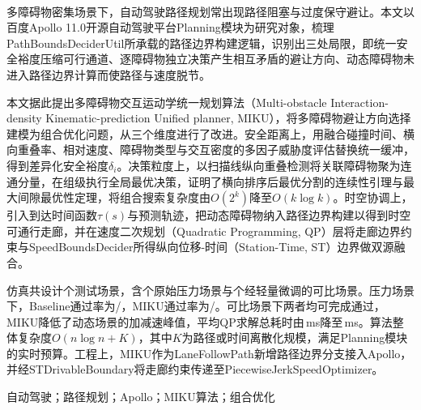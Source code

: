 \clearpage
{}
{}
\thispagestyle{fancy}

\begin{center}
{\heiti\bfseries \thesisTitleZhA\\\thesisTitleZhB}
\end{center}

\vspace{1em}

{\songti

\noindent\hspace{2em}{\heiti\bfseries 摘要：}多障碍物密集场景下，自动驾驶路径规划常出现路径阻塞与过度保守避让。本文以百度Apollo 11.0开源自动驾驶平台Planning模块为研究对象，梳理PathBoundsDeciderUtil所承载的路径边界构建逻辑，识别出三处局限，即统一安全裕度压缩可行通道、逐障碍物独立决策产生相互矛盾的避让方向、动态障碍物未进入路径边界计算而使路径与速度脱节。

本文据此提出多障碍物交互运动学统一规划算法（Multi-obstacle Interaction-density Kinematic-prediction Unified planner, MIKU），将多障碍物避让方向选择建模为组合优化问题，从三个维度进行了改进。安全距离上，用融合碰撞时间、横向重叠率、相对速度、障碍物类型与交互密度的多因子威胁度评估替换统一缓冲，得到差异化安全裕度$\delta_i$。决策粒度上，以扫描线纵向重叠检测将关联障碍物聚为连通分量，在组级执行全局最优决策，证明了横向排序后最优分割的连续性引理与最大间隙最优性定理，将组合搜索复杂度由$O(2^k)$降至$O(k\log k)$。时空协调上，引入到达时间函数$\tau(s)$与预测轨迹，把动态障碍物纳入路径边界构建以得到时空可通行走廊，并在速度二次规划（Quadratic Programming, QP）层将走廊边界约束与SpeedBoundsDecider所得纵向位移-时间（Station-Time, ST）边界做双源融合。

仿真共设计\MScenarioTotal{}个测试场景，含\MPressureScenarioTotal{}个原始压力场景与\MComparableScenarioTotal{}个经轻量微调的可比场景。压力场景下，Baseline通过率为\MPressureBaselinePassCount{}/\MPressureScenarioTotal{}，MIKU通过率为\MPressureMikuPassCount{}/\MPressureScenarioTotal{}。可比场景下两者均可完成通过，MIKU降低了动态场景的加减速峰值，平均QP求解总耗时由\MComparableBaselineQpTotal\,ms降至\MComparableMikuQpTotal\,ms。算法整体复杂度$O(n\log n+K)$，其中$K$为路径或时间离散化规模，满足Planning模块的实时预算。工程上，MIKU作为LaneFollowPath新增路径边界分支接入Apollo，并经STDrivableBoundary将走廊约束传递至PiecewiseJerkSpeedOptimizer。

\vspace{1em}
\noindent\hspace{2em}{\heiti\bfseries 关键词：}自动驾驶；路径规划；Apollo；MIKU算法；组合优化

}
